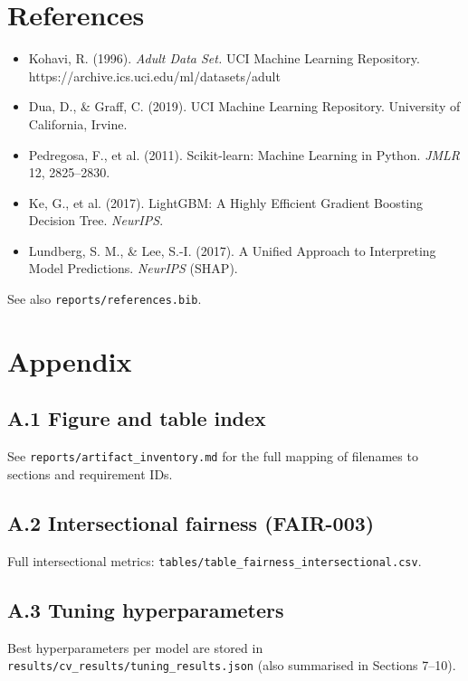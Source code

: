 ﻿\documentclass[11pt,a4paper]{article}
\begin{document}
\section{References}

\begin{itemize}
  \item Kohavi, R. (1996). \textit{Adult Data Set.} UCI Machine Learning Repository. https://archive.ics.uci.edu/ml/datasets/adult
  \item Dua, D., \& Graff, C. (2019). UCI Machine Learning Repository. University of California, Irvine.
  \item Pedregosa, F., et al. (2011). Scikit-learn: Machine Learning in Python. \textit{JMLR} 12, 2825–2830.
  \item Ke, G., et al. (2017). LightGBM: A Highly Efficient Gradient Boosting Decision Tree. \textit{NeurIPS}.
  \item Lundberg, S. M., \& Lee, S.-I. (2017). A Unified Approach to Interpreting Model Predictions. \textit{NeurIPS} (SHAP).
\end{itemize}

See also \texttt{reports/references.bib}.


\section{Appendix}

\subsection{A.1 Figure and table index}

See \texttt{reports/artifact\_inventory.md} for the full mapping of filenames to sections and requirement IDs.

\subsection{A.2 Intersectional fairness (FAIR-003)}

Full intersectional metrics: \texttt{tables/table\_fairness\_intersectional.csv}.

\subsection{A.3 Tuning hyperparameters}

Best hyperparameters per model are stored in \texttt{results/cv\_results/tuning\_results.json} (also summarised in Sections 7–10).
\end{document}
